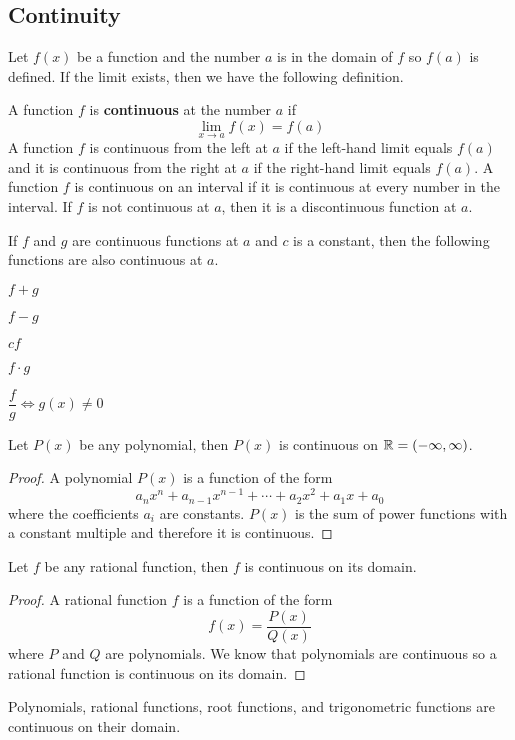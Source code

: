 \subsection{Continuity}
Let \(f(x)\) be a function and the number \(a\) is in the domain of \(f\) so
\(f(a)\) is defined.
If the limit exists, then we have the following definition.
\begin{definition}
    A function \(f\) is \textbf{continuous} at the number \(a\) if
    \[\lim_{x\to a}f(x)=f(a)\]
    A function \(f\) is continuous from the left at \(a\) if the left-hand limit
    equals \(f(a)\) and it is continuous from the right at \(a\) if the right-hand
    limit equals \(f(a)\).
    A function \(f\) is continuous on an interval if it is continuous
    at every number in the interval.
    If \(f\) is not continuous at \(a\), then it is a discontinuous function at \(a\).
\end{definition}
\begin{theorem}
    If \(f\) and \(g\) are continuous functions at \(a\) and \(c\) is a constant,
    then the following functions are also continuous at \(a\). \\
    \begin{itemize*}
        \item \(f+g\) \item \(f-g\) \item \(cf\) \item \(f\cdot g\)
        \item \(\dfrac{f}{g}\iff g(x)\neq 0\)
    \end{itemize*}
\end{theorem}
\begin{theorem}
    Let \(P(x)\) be any polynomial, then \(P(x)\) is continuous on
    \(\mathbb{R}=(-\infty,\infty)\).
\end{theorem}
\begin{proof}
    A polynomial \(P(x)\) is a function of the form
    \[a_nx^n+a_{n-1}x^{n-1}+\dotsb +a_{2}x^{2}+a_1x+a_0\]
    where the coefficients \(a_i\) are constants.
    \(P(x)\) is the sum of power functions with a constant multiple and
    therefore it is continuous.
\end{proof}
\begin{theorem}
    Let \(f\) be any rational function, then \(f\) is continuous on its domain.
\end{theorem}
\begin{proof}
    A rational function \(f\) is a function of the form
    \[f(x)=\frac{P(x)}{Q(x)}\] where \(P\) and \(Q\) are polynomials.
    We know that polynomials are continuous so a rational function is
    continuous on its domain.
\end{proof}
\begin{theorem}
    Polynomials, rational functions, root functions, and trigonometric
    functions are continuous on their domain.
\end{theorem}